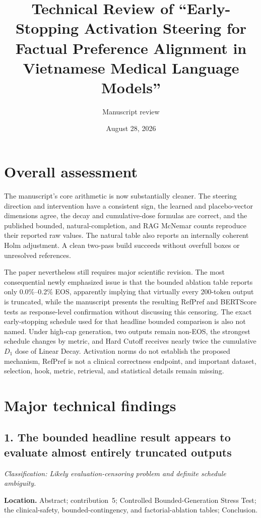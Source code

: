 \documentclass[11pt]{article}
\title{Technical Review of ``Early-Stopping Activation Steering for Factual Preference Alignment in Vietnamese Medical Language Models''}
\author{Manuscript review}
\date{August 28, 2026}
\newcommand{\findinglabel}[1]{\textbf{#1}}
\newcommand{\classification}[1]{\textit{Classification: #1.}}
\begin{document}
\maketitle

\section*{Overall assessment}

The manuscript's core arithmetic is now substantially cleaner.  The steering direction and intervention have a consistent sign, the learned and placebo-vector dimensions agree, the decay and cumulative-dose formulas are correct, and the published bounded, natural-completion, and RAG McNemar counts reproduce their reported raw values.  The natural table also reports an internally coherent Holm adjustment.  A clean two-pass build succeeds without overfull boxes or unresolved references.

The paper nevertheless still requires major scientific revision.  The most consequential newly emphasized issue is that the bounded ablation table reports only 0.0\%--0.2\% EOS, apparently implying that virtually every 200-token output is truncated, while the manuscript presents the resulting RefPref and BERTScore tests as response-level confirmation without discussing this censoring.  The exact early-stopping schedule used for that headline bounded comparison is also not named.  Under high-cap generation, two outputs remain non-EOS, the strongest schedule changes by metric, and Hard Cutoff receives nearly twice the cumulative $D_1$ dose of Linear Decay.  Activation norms do not establish the proposed mechanism, RefPref is not a clinical correctness endpoint, and important dataset, selection, hook, metric, retrieval, and statistical details remain missing.

\section*{Major technical findings}

\subsection*{1. The bounded headline result appears to evaluate almost entirely truncated outputs}

\classification{Likely evaluation-censoring problem and definite schedule ambiguity}

\findinglabel{Location.} Abstract; contribution~5; Controlled Bounded-Generation Stress Test; the clinical-safety, bounded-contingency, and factorial-ablation tables; Conclusion.
\end{document}
